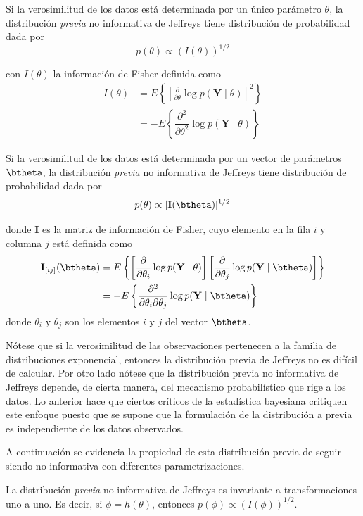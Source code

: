 \begin{Defi}
Si la verosimilitud de los datos está determinada por un único parámetro $\theta$, la distribución \emph{previa} no informativa de Jeffreys tiene distribución de probabilidad dada por
\begin{equation}
p(\theta)\propto (I(\theta))^{1/2}
\end{equation}

con $I(\theta)$ la información de Fisher definida como
\begin{align*}
I(\theta)&=E\left\{\left[\frac{\partial}{\partial\theta}\log{p(\mathbf{Y}\mid\theta)}\right]^2\right\}\\
&=-E\left\{\dfrac{\partial^2}{\partial\theta^2}\log{p(\mathbf{Y}\mid\theta)}\right\}
\end{align*}

Si la verosimilitud de los datos está determinada por un vector de parámetros $\btheta$, la distribución \emph{previa} no informativa de Jeffreys tiene distribución de probabilidad dada por
\begin{equation}
p(\theta)\propto |\mathbf{I}(\btheta)|^{1/2}
\end{equation}

donde $\mathbf{I}$ es la matriz de información de Fisher, cuyo elemento en la fila $i$ y columna $j$ está definida como
\begin{align*}
\mathbf{I}_{[ij]}(\btheta)&=E\left\{\left[\frac{\partial}{\partial\theta_i}\log{p(\mathbf{Y}\mid\theta)}\right]\left[\frac{\partial}{\partial\theta_j}\log{p(\mathbf{Y}\mid\btheta)}\right]\right\}\\
&=-E\left\{\dfrac{\partial^2}{\partial\theta_i\partial\theta_j}\log{p(\mathbf{Y}\mid\btheta)}\right\}
\end{align*}
donde $\theta_i$ y $\theta_j$ son los elementos $i$ y $j$ del vector $\btheta$.
\end{Defi}

Nótese que si la verosimilitud de las observaciones pertenecen a la familia de distribuciones exponencial, entonces la distribución previa de Jeffreys no es difícil de calcular. Por otro lado nótese que la distribución previa no informativa de Jeffreys depende, de cierta manera, del mecanismo probabilístico que rige a los datos. Lo anterior hace que ciertos críticos de la estadística bayesiana critiquen este enfoque puesto que se supone que la formulación de la distribución a previa es independiente de los datos observados.

A continuación se evidencia la propiedad de esta distribución previa de seguir siendo no informativa con diferentes parametrizaciones. 
\begin{Res}
La distribución \emph{previa} no informativa de Jeffreys es invariante a transformaciones uno a uno. Es decir, si $\phi=h(\theta)$, entonces $p(\phi)\propto(I(\phi))^{1/2}$.
\end{Res}

